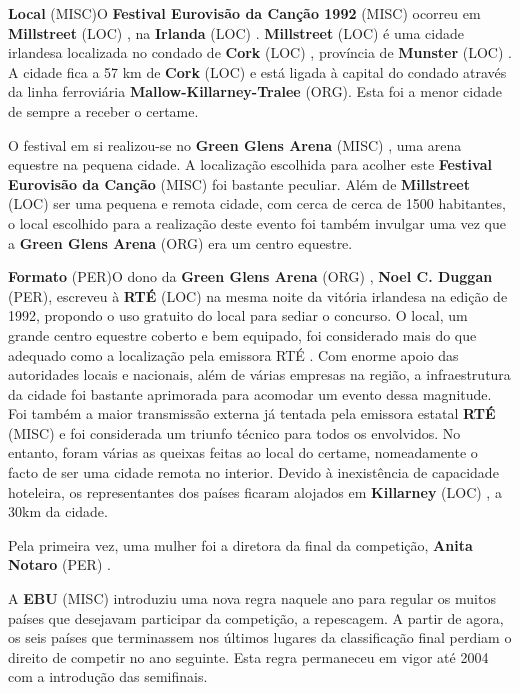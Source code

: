 \documentclass[12pt,a4paper]{article}
\begin{document}
\textbf{Local} (MISC)O \textbf{Festival Eurovisão da Canção 1992} (MISC) ocorreu em \textbf{Millstreet} (LOC) , na \textbf{Irlanda} (LOC) . \textbf{Millstreet} (LOC) é uma cidade irlandesa localizada no condado de \textbf{Cork} (LOC) , província de \textbf{Munster} (LOC) . A cidade fica a 57 km de \textbf{Cork} (LOC) e está ligada à capital do condado através da linha ferroviária \textbf{Mallow-Killarney-Tralee} (ORG). Esta foi a menor cidade de sempre a receber o certame.

O festival em si realizou-se no \textbf{Green Glens Arena} (MISC) , uma arena equestre na pequena cidade. A localização escolhida para acolher este \textbf{Festival Eurovisão da Canção} (MISC) foi bastante peculiar. Além de \textbf{Millstreet} (LOC) ser uma pequena e remota cidade, com cerca de cerca de 1500 habitantes, o local escolhido para a realização deste evento foi também invulgar uma vez que a \textbf{Green Glens Arena} (ORG) era um centro equestre.



\textbf{Formato} (PER)O dono da \textbf{Green Glens Arena} (ORG) , \textbf{Noel C. Duggan} (PER), escreveu à \textbf{RTÉ} (LOC) na mesma noite da vitória irlandesa na edição de 1992, propondo o uso gratuito do local para sediar o concurso. O local, um grande centro equestre coberto e bem equipado, foi considerado mais do que adequado como a localização pela emissora RTÉ . Com enorme apoio das autoridades locais e nacionais, além de várias empresas na região, a infraestrutura da cidade foi bastante aprimorada para acomodar um evento dessa magnitude. Foi também a maior transmissão externa já tentada pela emissora estatal \textbf{RTÉ} (MISC) e foi considerada um triunfo técnico para todos os envolvidos. No entanto, foram várias as queixas feitas ao local do certame, nomeadamente o facto de ser uma cidade remota no interior. Devido à inexistência de capacidade hoteleira, os representantes dos países ficaram alojados em \textbf{Killarney} (LOC) , a 30km da cidade.

Pela primeira vez, uma mulher foi a diretora da final da competição, \textbf{Anita Notaro} (PER) .

A \textbf{EBU} (MISC) introduziu uma nova regra naquele ano para regular os muitos países que desejavam participar da competição, a repescagem. A partir de agora, os seis países que terminassem nos últimos lugares da classificação final perdiam o direito de competir no ano seguinte. Esta regra permaneceu em vigor até 2004 com a introdução das semifinais.
\end{document}
